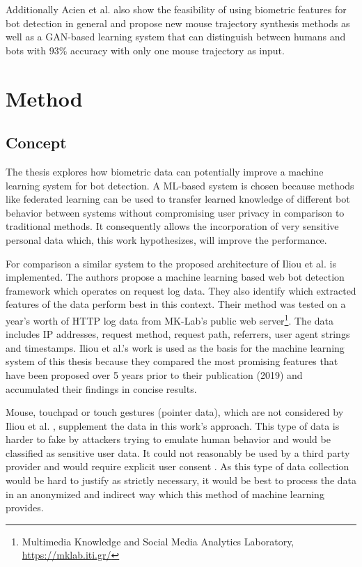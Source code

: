 \documentclass[
    fontsize=12pt,
    headings=small,
    parskip=half,           %
    bibliography=totoc,
    numbers=noenddot,       %
    open=any,               %
    final                   %
]{scrreprt}
\begin{document}
Additionally Acien et al. \cite{Acien2020BeCAPTCHAMouseSM} also show the feasibility of using biometric features for bot detection in general and propose new mouse trajectory synthesis methods as well as a GAN-based learning system that can distinguish between humans and bots with $93\%$ accuracy with only one mouse trajectory as input.


\chapter{Method}

\section{Concept}

The thesis explores how biometric data can potentially improve a machine learning system for bot detection. A ML-based system is chosen because methods like federated learning \cite{DBLP:journals/corr/KonecnyMR15} \cite{DBLP:journals/corr/KonecnyMRR16} can be used to transfer learned knowledge of different bot behavior between systems without compromising user privacy in comparison to traditional methods. It consequently allows the incorporation of very sensitive personal data which, this work hypothesizes, will improve the performance.

For comparison a similar system to the proposed architecture of Iliou et al. \cite{10.1145/3339252.3339267} is implemented. The authors propose a machine learning based web bot detection framework which operates on request log data. They also identify which extracted features of the data perform best in this context. Their method was tested on a year's worth of HTTP log data from MK-Lab's public web server\footnote{Multimedia Knowledge and Social Media Analytics Laboratory, \url{https://mklab.iti.gr/}}. The data includes IP addresses, request method, request path, referrers, user agent strings and timestamps.
Iliou et al.'s work is used as the basis for the machine learning system of this thesis because they compared the most promising features that have been proposed over 5 years prior to their publication (2019) and accumulated their findings in concise results.

Mouse, touchpad or touch gestures (pointer data), which are not considered by Iliou et al. \cite{10.1145/3339252.3339267}, supplement the data in this work's approach. This type of data is harder to fake by attackers trying to emulate human behavior and would be classified as sensitive user data. It could not reasonably be used by a third party provider and would require explicit user consent \cite{GDPR}. As this type of data collection would be hard to justify as strictly necessary, it would be best to process the data in an anonymized and indirect way which this method of machine learning provides.
\end{document}
